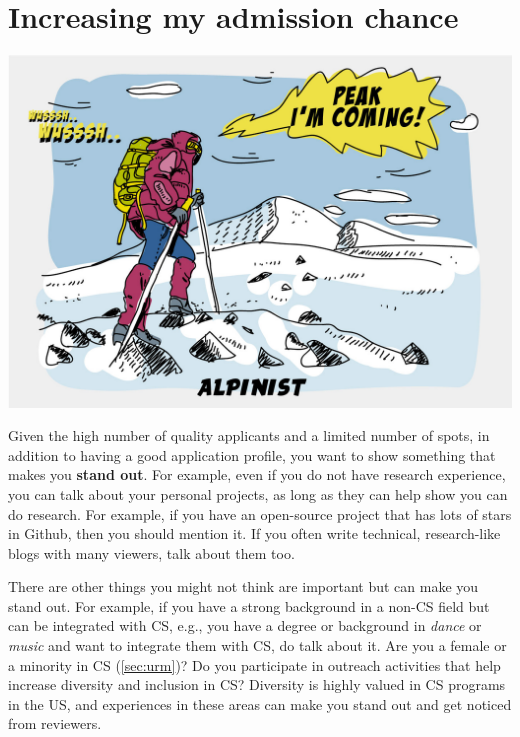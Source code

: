 \documentclass[oneside,11pt,dvipsnames]{book}
\begin{document}
\section{Increasing my admission chance}\label{sec:improve-your-chance}

\begin{center}
  \includegraphics[scale=0.2]{files/alpinist-climbing-peak-mountain-comic-hand-drawn-vector-illustration.jpg}
\end{center}


Given the high number of quality applicants and a limited number of spots, in addition to having a good application profile, you want to show something that makes you \textbf{stand out}.  For example, even if you do not have research experience, you can talk about your personal projects, as long as they can help show you can do research. For example, if you have an open-source project that has lots of stars in Github, then you should mention it. If you often write technical, research-like blogs with many viewers, talk about them too.

There are other things you might not think are important but can make you stand out. For example, if you have a strong background in a non-CS field but can be integrated with CS, e.g., you have a degree or background in \emph{dance} or \emph{music} and want to integrate them with CS, do talk about it. Are you a female or a minority in CS (\autoref{sec:urm})? Do you participate in outreach activities that help increase diversity and inclusion in CS? Diversity is highly valued in CS programs in the US, and experiences in these areas can make you stand out and get noticed from reviewers.
\end{document}
